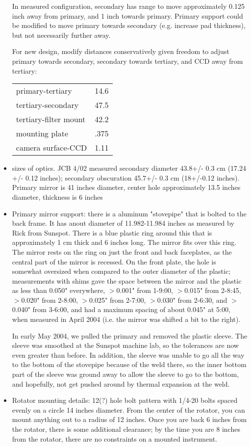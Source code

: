 \documentclass{article}[12pt]
\begin{document}
\begin{itemize}
In measured configuration, secondary has range to move approximately 0.125
inch away from primary, and 1 inch towards primary. Primary support could 
be modified to move primary towards secondary (e.g. increase pad thickness),
but not necessarily further away.

For new design, modify distances conservatively given freedom to adjust
primary towards secondary, secondary towards tertiary, and CCD away from
tertiary:

\begin{center}
\begin{tabular}{ll}
primary-tertiary&14.6\\
tertiary-secondary&47.5\\
tertiary-filter mount&42.2\\
mounting plate&.375\\
camera surface-CCD&1.11
\end{tabular}
\end{center}

\item sizes of optics. JCB 4/02 measured secondary diameter 43.8+/- 0.3 cm
(17.24 +/- 0.12 inches); secondary obscuration 45.7+/- 0.3 cm 
(18+/-0.12 inches). Primary mirror is 41 inches diameter, center hole 
approximately 13.5 inches diameter, thickness is 6 inches

\item Primary mirror support: there is a aluminum "stovepipe" that is
bolted to the back frame. It has anout diameter of 11.982-11.984 inches
as measured by Rick from Sunspot. There is a blue plastic ring around
this that is approximately 1 cm thick and 6 inches long. The mirror
fits over this ring. The mirror rests on the ring on just the front and
back faceplates, as the central part of the mirror is recessed. On the
front plate, the hole is somewhat oversized when compared to the outer
diameter of the plastic; measurements with shims gave the space between
the mirror and the plastic as less than 0.050" everywhere, $>$0.001" 
from 1-9:00, $>$0.015" from 2-8:45, $>$0.020" from
2-8:00, $>$0.025" from 2-7:00, $>$0.030" from 2-6:30, and $>$ 0.040" from
3-6:00, and had a maximum spacing of about 0.045" at 5:00, when 
measured in April 2004 (i.e. the mirror was shifted a bit to the right).

In early May 2004, we pulled the primary and removed the plastic sleeve.
The sleeve was smoothed at the Sunspot machine lab, so the tolerances
are now even greater than before. In addition, the sleeve was unable to
go all the way to the bottom of the stovepipe because of the weld there, so
the inner bottom part of the sleeve was ground away to allow the sleeve
to go to the bottom, and hopefully, not get pushed around by thermal expansion
at the weld.
\item Rotator mounting details: 12(?) hole bolt pattern with 1/4-20 bolts 
spaced evenly on a circle 14 inches diameter. From the center of the
rotator, you can mount anything out to a radius of 12 inches. Once you
are back 6 inches from the rotator, there is some additional clearance;
by the time you are 8 inches from the rotator, there are no constraints
on a mounted instrument.


\end{itemize}
\end{document}
